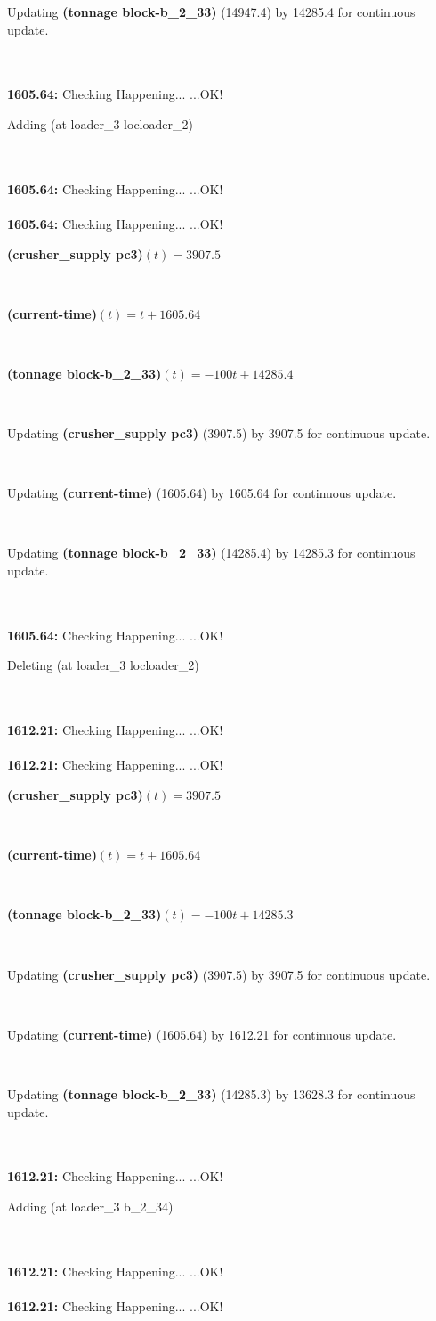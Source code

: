 \documentclass[a4paper,12pt]{article}
\newcommand{\atime}[1]{{\bf #1:}}
\newcommand{\exprn}[1]{{\sf #1}}
\newcommand{\fexprn}[1]{{\small {\bf #1}}}
\newcommand{\checkhappening}{Checking Happening... }
\newcommand{\listrow}[1]{\begin{minipage}[t]{11.5cm} #1 \end{minipage}}
\newcommand{\happeningOK}{...OK!}
\newcommand{\assignmentcts}[3]{\listrow{Updating \fexprn{#1} (#2) by #3 for continuous update.}}
\newcommand{\function}[2]{\listrow{\fexprn{#1}$(t) = #2$}}
\newcommand{\adding}[1]{\listrow{Adding \exprn{#1} }}
\newcommand{\deleting}[1]{\listrow{Deleting \exprn{#1} }}
\begin{document}
\begin{tabbing}
 \> \assignmentcts{(tonnage block-b\_2\_33)}{14947.4}{14285.4}\\
\\
\atime{1605.64} \> \checkhappening\happeningOK\\
 \> \adding{(at loader\_3 locloader\_2)}\\
\\
\atime{1605.64} \> \checkhappening\happeningOK\\
\\
\atime{1605.64} \> \checkhappening\happeningOK\\
 \> \function{(crusher\_supply pc3)}{3907.5}\\
 \> \function{(current-time)}{t + 1605.64}\\
 \> \function{(tonnage block-b\_2\_33)}{ - 100t + 14285.4}\\
 \> \assignmentcts{(crusher\_supply pc3)}{3907.5}{3907.5}\\
 \> \assignmentcts{(current-time)}{1605.64}{1605.64}\\
 \> \assignmentcts{(tonnage block-b\_2\_33)}{14285.4}{14285.3}\\
\\
\atime{1605.64} \> \checkhappening\happeningOK\\
 \> \deleting{(at loader\_3 locloader\_2)}\\
\\
\atime{1612.21} \> \checkhappening\happeningOK\\
\\
\atime{1612.21} \> \checkhappening\happeningOK\\
 \> \function{(crusher\_supply pc3)}{3907.5}\\
 \> \function{(current-time)}{t + 1605.64}\\
 \> \function{(tonnage block-b\_2\_33)}{ - 100t + 14285.3}\\
 \> \assignmentcts{(crusher\_supply pc3)}{3907.5}{3907.5}\\
 \> \assignmentcts{(current-time)}{1605.64}{1612.21}\\
 \> \assignmentcts{(tonnage block-b\_2\_33)}{14285.3}{13628.3}\\
\\
\atime{1612.21} \> \checkhappening\happeningOK\\
 \> \adding{(at loader\_3 b\_2\_34)}\\
\\
\atime{1612.21} \> \checkhappening\happeningOK\\
\\
\atime{1612.21} \> \checkhappening\happeningOK\\

\end{tabbing}
\end{document}
